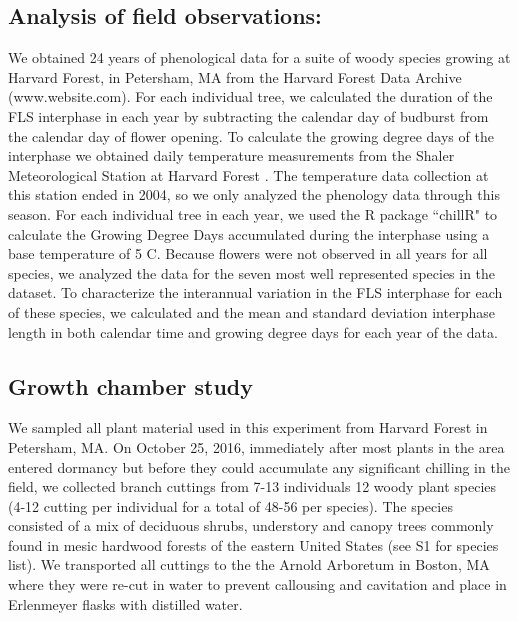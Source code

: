 \documentclass[11pt]{article}
\begin{document}
\subsection*{Analysis of field observations:}
\noindent We obtained 24 years of phenological data for a suite of woody species growing at Harvard Forest, in Petersham, MA \citep{Okeefe2015} from the Harvard Forest Data Archive (www.website.com).  For each individual tree, we calculated the duration of the FLS interphase in each year by subtracting the calendar day of budburst from the calendar day of flower opening. To calculate the growing degree days of the interphase we obtained daily temperature measurements from the Shaler Meteorological Station at Harvard Forest \citep{}. The temperature data collection at this station ended in 2004, so we only analyzed the phenology data through this season. For each individual tree in each year, we used the R package ``chillR" \citep{} to calculate the Growing Degree Days accumulated during the interphase using a base temperature of 5 \degree C. Because flowers were not observed in all years for all species, we analyzed the data for the seven most well represented species in the dataset. To characterize the interannual variation in the FLS interphase for each of these species, we calculated and the mean and standard deviation interphase length in both calendar time and growing degree days for each year of the data.
\subsection*{Growth chamber study}
\noindent We sampled all plant material used in this experiment from Harvard Forest in Petersham, MA. On October 25, 2016, immediately after most plants in the area entered dormancy but before they could accumulate any significant chilling in the field,  we collected branch cuttings from 7-13 individuals 12 woody plant species (4-12 cutting per individual for a total of 48-56 per species). The species consisted of a mix of deciduous shrubs, understory and canopy trees commonly found in mesic hardwood forests of the eastern United States (see S1 for species list). We transported all cuttings to the the Arnold Arboretum in Boston, MA where they were re-cut in water to prevent callousing and cavitation and place in Erlenmeyer flasks with distilled water.\\
\end{document}
